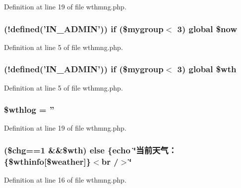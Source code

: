 Definition at line 19 of file wthmng.\+php.

\hypertarget{wthmng_8php_a9a83b1733625446c9ee0a3948de6361e}{
\subsubsection[{\$now}]{ (!defined('{\bf I\+N\+\_\+\+A\+D\+M\+I\+N}')) {\bf if} (\$mygroup$<$ 3) global \$now}}\label{wthmng_8php_a9a83b1733625446c9ee0a3948de6361e}


Definition at line 5 of file wthmng.\+php.

\hypertarget{wthmng_8php_ad5e52a89d9e0b69141263b4677e63da8}{
\subsubsection[{\$wth}]{ (!defined('{\bf I\+N\+\_\+\+A\+D\+M\+I\+N}')) {\bf if} (\$mygroup$<$ 3) global \$wth}}\label{wthmng_8php_ad5e52a89d9e0b69141263b4677e63da8}


Definition at line 5 of file wthmng.\+php.

\hypertarget{wthmng_8php_a05660d8a804cda83148122637b2e749f}{
\subsubsection[{\$wthlog}]{\setlength{\rightskip}{0pt plus 5cm}\$wthlog = ''}}\label{wthmng_8php_a05660d8a804cda83148122637b2e749f}


Definition at line 19 of file wthmng.\+php.

\hypertarget{wthmng_8php_a44a6fc063fac259f71ad7ffa0cd87dbc}{
\subsubsection[{else}]{ (\$chg==1 \&\&\$wth) else \{echo \char`\"{}当前天气：\{\$wthinfo\mbox{[}\$weather\mbox{]}\}$<$br /$>$\char`\"{}}}\label{wthmng_8php_a44a6fc063fac259f71ad7ffa0cd87dbc}


Definition at line 16 of file wthmng.\+php.

